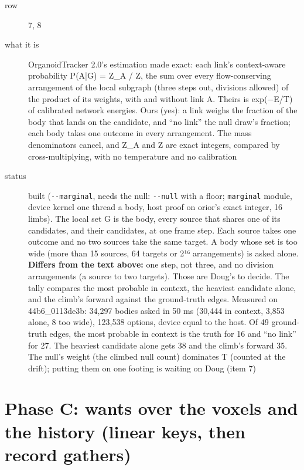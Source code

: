 \begin{description}
\item[{row}] 7, 8
\item[{what it is}] OrganoidTracker 2.0's estimation made exact: each link's context-aware probability P(A|G) = Z\_\allowbreak{}A / Z, the sum over every flow-conserving arrangement of the local subgraph (three steps out, divisions allowed) of the product of its weights, with and without link A. Theirs is exp(−E/T) of calibrated network energies. Ours (yes): a link weighs the fraction of the body that lands on the candidate, and “no link” the null draw's fraction; each body takes one outcome in every arrangement. The mass denominators cancel, and Z\_\allowbreak{}A and Z are exact integers, compared by cross-multiplying, with no temperature and no calibration
\item[{status}] built (\texttt{-\allowbreak{}-\allowbreak{}marginal}, needs the null: \texttt{-\allowbreak{}-\allowbreak{}null} with a floor; \texttt{marginal} module, device kernel one thread a body, host proof on orior's exact integer, 16 limbs). The local set G is the body, every source that shares one of its candidates, and their candidates, at one frame step. Each source takes one outcome and no two sources take the same target. A body whose set is too wide (more than 15 sources, 64 targets or 2¹⁶ arrangements) is asked alone. \textbf{Differs from the text above:} one step, not three, and no division arrangements (a source to two targets). Those are Doug's to decide. The tally compares the most probable in context, the heaviest candidate alone, and the climb's forward against the ground-truth edges. Measured on 44b6\_\allowbreak{}0113de3b: 34,297 bodies asked in 50 ms (30,444 in context, 3,853 alone, 8 too wide), 123,538 options, device equal to the host. Of 49 ground-truth edges, the most probable in context is the truth for 16 and “no link” for 27. The heaviest candidate alone gets 38 and the climb's forward 35. The null's weight (the climbed null count) dominates T (counted at the drift); putting them on one footing is waiting on Doug (item 7)
\end{description}

\section{\texorpdfstring{Phase C: wants over the voxels and the history (linear keys, then record gathers)}{Phase C: wants over the voxels and the history (linear keys, then record gathers)}}

